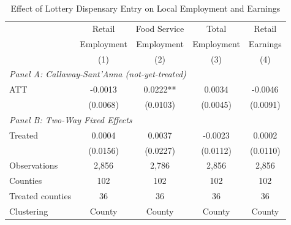 \begin{table}[t]
\centering
\caption{Effect of Lottery Dispensary Entry on Local Employment and Earnings}
\label{tab:main}
\begin{tabular}{lcccc}
\hline\hline
 & Retail & Food Service & Total & Retail \\
 & Employment & Employment & Employment & Earnings \\
 & (1) & (2) & (3) & (4) \\
\hline
\multicolumn{5}{l}{\textit{Panel A: Callaway-Sant'Anna (not-yet-treated)}} \\[3pt]
ATT & -0.0013 & 0.0222** & 0.0034 & -0.0046 \\
 & (0.0068) & (0.0103) & (0.0045) & (0.0091) \\[3pt]
\multicolumn{5}{l}{\textit{Panel B: Two-Way Fixed Effects}} \\[3pt]
Treated & 0.0004 & 0.0037 & -0.0023 & 0.0002 \\
 & (0.0156) & (0.0227) & (0.0112) & (0.0110) \\[6pt]
\hline
Observations & 2,856 & 2,786 & 2,856 & 2,856 \\
Counties & 102 & 102 & 102 & 102 \\
Treated counties & 36 & 36 & 36 & 36 \\
Clustering & County & County & County & County \\
\hline\hline
\end{tabular}
\par{}
\end{table}
